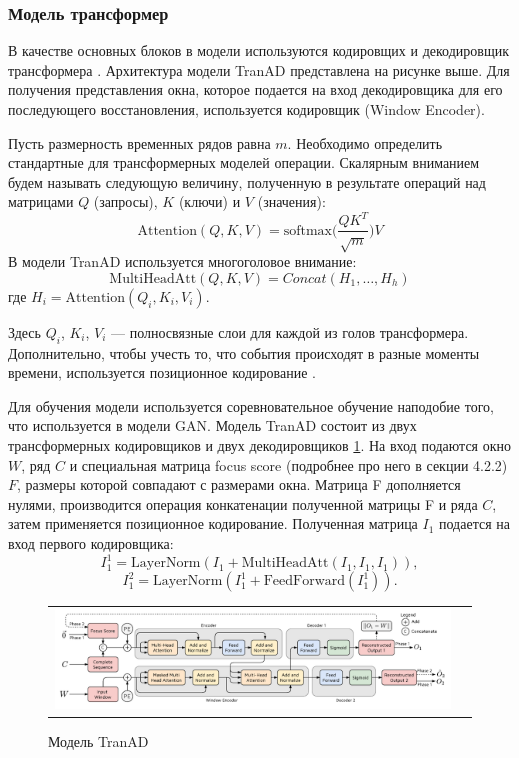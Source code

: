\documentclass{article}
\begin{document}
\subsubsection{Модель трансформер}
В качестве основных блоков в модели используются кодировщих и декодировщик трансформера \cite{attention}. Архитектура модели TranAD представлена на рисунке выше. Для получения представления окна, которое подается на вход декодировщика для его последующего восстановления, используется кодировщик (Window Encoder). 

Пусть размерность временных рядов равна $m$. Необходимо определить стандартные для трансформерных моделей операции. Скалярным вниманием будем называть следующую величину, полученную в результате операций над матрицами $Q$ (запросы), $K$ (ключи) и $V$ (значения): 
$$
\text{Attention}(Q, K, V) = \text{softmax}\big ( \frac{QK^T}{\sqrt{m}} \big )V
$$
В модели TranAD используется многоголовое внимание: 
$$
\text{MultiHeadAtt}(Q, K, V) = Concat(H_1, \dots, H_h)
$$
где $H_i = \text{Attention}(Q_i, K_i, V_i)$. 

Здесь $Q_i$, $K_i$, $V_i$ --- полносвязные слои для каждой из голов трансформера. Дополнительно, чтобы учесть то, что события происходят в разные моменты времени, используется позиционное кодирование \cite{attention}. 

Для обучения модели используется соревновательное обучение наподобие того, что используется в модели GAN. Модель TranAD состоит из двух трансформерных кодировщиков и двух декодировщиков \ref{fig:TranAD}. На вход подаются окно $W$, ряд $C$ и специальная матрица focus score (подробнее про него в секции 4.2.2) $F$, размеры которой совпадают с размерами окна. Матрица F дополняется нулями, производится операция конкатенации полученной матрицы F и ряда $C$, затем применяется позиционное кодирование. Полученная матрица $I_1$ подается на вход первого кодировщика: 
$$
I_1^1 = \text{LayerNorm}(I_1 + \text{MultiHeadAtt}(I_1, I_1, I_1)),
$$
$$
I_1^2 = \text{LayerNorm}(I_1^1 + \text{FeedForward}(I^1_1)). 
$$

\begin{figure}[h]
\begin{tabular}{cc}
  \includegraphics[width=160mm]{3.pdf}
\end{tabular}
\caption{Модель TranAD}
\label{fig:TranAD}
\end{figure}
\end{document}
